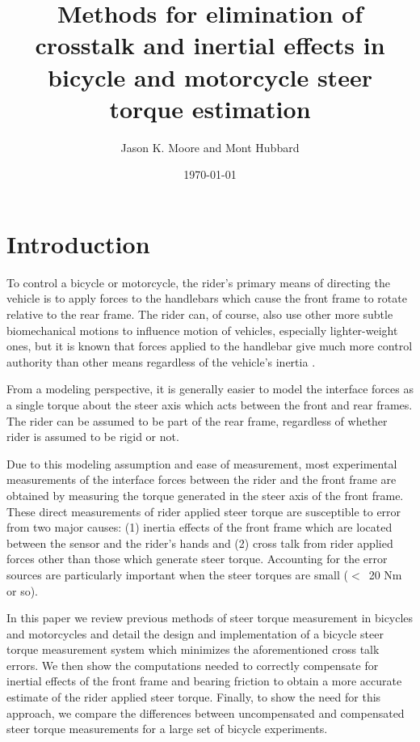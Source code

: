 \documentclass[a4paper]{article}
\title{Methods for elimination of crosstalk and inertial effects in bicycle and motorcycle steer torque estimation}
\author{Jason K. Moore and Mont Hubbard}
\date{\today}
\begin{document}
\maketitle

\section*{Introduction}

To control a bicycle or motorcycle, the rider's primary means of directing the
vehicle is to apply forces to the handlebars which cause the front frame to
rotate relative to the rear frame. The rider can, of course, also use other
more subtle biomechanical motions to influence motion of vehicles, especially
lighter-weight ones, but it is known that forces applied to the handlebar give
much more control authority than other means regardless of the vehicle's
inertia \cite{Sharp2008a}.

From a modeling perspective, it is generally easier to model the interface
forces as a single torque about the steer axis which acts between the front and
rear frames. The rider can be assumed to be part of the rear frame, regardless
of whether rider is assumed to be rigid or not.

Due to this modeling assumption and ease of measurement, most experimental
measurements of the interface forces between the rider and the front frame are
obtained by measuring the torque generated in the steer axis of the front
frame. These direct measurements of rider applied steer torque are susceptible
to error from two major causes: (1) inertia effects of the front frame which
are located between the sensor and the rider's hands and (2) cross talk from
rider applied forces other than those which generate steer torque. Accounting
for the error sources are particularly important when the steer torques are
small ($<$~20 Nm or so).

In this paper we review previous methods of steer torque measurement in
bicycles and motorcycles and detail the design and implementation of a bicycle
steer torque measurement system which minimizes the aforementioned cross talk
errors. We then show the computations needed to correctly compensate for
inertial effects of the front frame and bearing friction to obtain a more
accurate estimate of the rider applied steer torque. Finally, to show the need
for this approach, we compare the differences between uncompensated and
compensated steer torque measurements for a large set of bicycle experiments.
\end{document}
